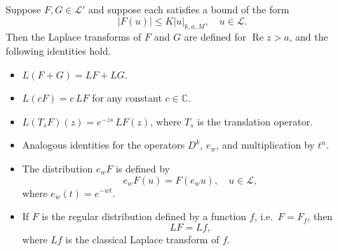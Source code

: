 Suppose $F, G \in \mathcal{L}'$ and suppose each satisfies a bound of the form
$$|F(u)| \leq K |u|_{k,a,M}, \quad u \in \mathcal{L}.$$
Then the Laplace transforms of $F$ and $G$ are defined for $\operatorname{Re} z > a$, and the following identities hold.

\begin{itemize}
  \item[(5)] $L(F+G) = LF + LG$.
  \item[(6)] $L(cF) = c\,LF$ for any constant $c \in \mathbb{C}$.
  \item[(7)] $L(T_s F)(z) = e^{-zs}\,LF(z)$, where $T_s$ is the translation operator.
  \item[(8)--(10)] Analogous identities for the operators $D^k$, $e_w$, and multiplication by $t^n$.
  \item[(11)] The distribution $e_w F$ is defined by
    $$e_w F(u) = F(e_w u), \quad u \in \mathcal{L},$$
    where $e_w(t) = e^{-wt}$.
  \item[(12)] If $F$ is the regular distribution defined by a function $f$, i.e.\ $F = F_f$, then
    $$LF = Lf,$$
    where $Lf$ is the classical Laplace transform of $f$.
\end{itemize}
